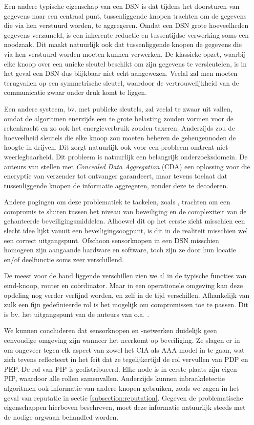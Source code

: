 Een andere typische eigenschap van een DSN is dat tijdens het doorsturen van
gegevens naar een centraal punt, tussenliggende knopen trachten om de gegevens
die via hen verstuurd worden, te aggregeren. Omdat een DSN grote hoeveelheden
gegevens verzameld, is een inherente reductie en tussentijdse verwerking soms
een noodzaak. Dit maakt natuurlijk ook dat tussenliggende knopen de gegevens
die via hen verstuurd worden moeten kunnen verwerken. De klassieke opzet,
waarbij elke knoop over een unieke sleutel beschikt om zijn gegevens te
versleutelen, is in het geval een DSN dus blijkbaar niet echt aangewezen.
Veelal zal men moeten terugvallen op een symmetrische sleutel, waardoor
de vertrouwelijkheid van de communicatie zwaar onder druk komt te liggen.

Een andere systeem, bv. met publieke sleutels, zal veelal te zwaar uit vallen,
omdat de algoritmen enerzijds een te grote belasting zouden vormen voor de
rekenkracht en zo ook het energieverbruik zouden taxeren. Anderzijds zou de
hoeveelheid sleutels die elke knoop zou moeten beheren de geheugennoden de
hoogte in drijven. Dit zorgt natuurlijk ook voor een probleem omtrent
niet-weerlegbaarheid. Dit probleem is natuurlijk een belangrijk
onderzoeksdomein. De auteurs van \citep{girao2005cda} stellen met
\emph{Concealed Data Aggregation} (CDA) een oplossing voor die encryptie van
verzender tot ontvanger garandeert, maar tevens toelaat dat tussenliggende
knopen de informatie aggregeren, zonder deze te decoderen.

Andere pogingen om deze problematiek te tackelen, zoals
\citep{wilke2009framework}, trachten om een compromis te sluiten tussen het
niveau van beveiliging en de complexiteit van de gehanteerde
beveiligingsmiddelen. Alhoewel dit op het eerste zicht misschien een slecht
idee lijkt vanuit een beveiligingsoogpunt, is dit in de realiteit misschien wel
een correct uitgangspunt. Ofschoon sensorknopen in een DSN misschien homogeen
zijn aangaande hardware en software, toch zijn ze door hun locatie en/of
deelfunctie soms zeer verschillend.

De meest voor de hand liggende verschillen zien we al in de typische functies
van eind-knoop, router en co\"ordinator. Maar in een operationele omgeving kan
deze opdeling nog verder verfijnd worden, en zelf in de tijd verschillen.
Afhankelijk van zulk een fijn gedefinieerde rol is het mogelijk om compromissen
toe te passen. Dit is bv. het uitgangspunt van de auteurs van o.a.
\citep{afzal2012difisec}.

We kunnen concluderen dat sensorknopen en -netwerken duidelijk geen eenvoudige
omgeving zijn wanneer het neerkomt op beveiliging. Ze slagen er in om ongeveer
tegen elk aspect van zowel het CIA als AAA model in te gaan, wat zich tevens
reflecteert in het feit dat ze tegelijkertijd de rol vervullen van PDP en PEP.
De rol van PIP is gedistribueerd. Elke node is in eerste plaats zijn eigen PIP,
waardoor alle rollen samenvallen. Anderzijds kunnen inbraakdetectie algoritmen
ook informatie van andere knopen gebruiken, zoals we zagen in het geval van
reputatie in sectie \ref{subsection:reputation}. Gegeven de problematische
eigenschappen hierboven beschreven, moet deze informatie natuurlijk steeds met
de nodige argwaan behandled worden.

